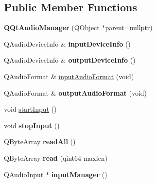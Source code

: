 \subsection*{Public Member Functions}
\begin{DoxyCompactItemize}
\item 
\mbox{\label{class_q_qt_audio_manager_af4c15a60e54ddcb24c629cd84faf0da6}} 
{\bfseries Q\+Qt\+Audio\+Manager} (Q\+Object $\ast$parent=nullptr)
\item 
\mbox{\label{class_q_qt_audio_manager_aee4d1db7a21c13b55dea0febb71bf8a8}} 
Q\+Audio\+Device\+Info \& {\bfseries input\+Device\+Info} ()
\item 
\mbox{\label{class_q_qt_audio_manager_af9e51f192c5ac4335f375455b67d48df}} 
Q\+Audio\+Device\+Info \& {\bfseries output\+Device\+Info} ()
\item 
Q\+Audio\+Format \& \mbox{\hyperlink{class_q_qt_audio_manager_ab1fd943d45b78a71e645f81ad35017af}{input\+Audio\+Format}} (void)
\item 
\mbox{\label{class_q_qt_audio_manager_ac4fceb30fc9ce05da564587c5397f4d3}} 
Q\+Audio\+Format \& {\bfseries output\+Audio\+Format} (void)
\item 
void \mbox{\hyperlink{class_q_qt_audio_manager_a52342f883617ae2eff12813ae171810c}{start\+Input}} ()
\item 
\mbox{\label{class_q_qt_audio_manager_acebdbef5acc2aa62c437233b70003960}} 
void {\bfseries stop\+Input} ()
\item 
\mbox{\label{class_q_qt_audio_manager_a26393ce110da69d23d6988496ddd7d0a}} 
Q\+Byte\+Array {\bfseries read\+All} ()
\item 
\mbox{\label{class_q_qt_audio_manager_a73a69f6ed2d2ea740974d17b26dcbc14}} 
Q\+Byte\+Array {\bfseries read} (qint64 maxlen)
\item 
\mbox{\label{class_q_qt_audio_manager_a0fa3c596503da0410d32dbf332594ff2}} 
Q\+Audio\+Input $\ast$ {\bfseries input\+Manager} ()
\item 

\end{DoxyCompactItemize}
